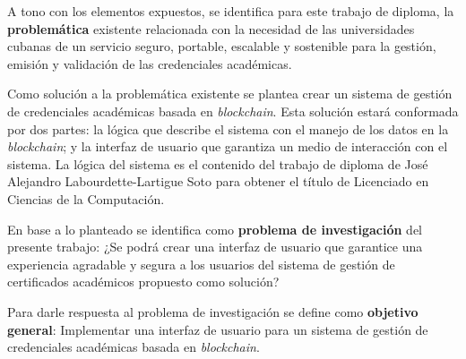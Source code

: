 
A tono con los elementos expuestos, se identifica para este trabajo de diploma, la \textbf{problem\'atica} existente relacionada con la necesidad de las universidades cubanas de un servicio seguro, portable, escalable y sostenible para la gestión, emisión y validación de las credenciales académicas.

Como solución a la problemática existente se plantea crear un sistema de gestión de credenciales académicas basada en \textit{blockchain}. Esta solución estará conformada por dos partes: la lógica que describe el sistema con el manejo de los datos en la \textit{blockchain}; y la interfaz de usuario que garantiza un medio de interacción con el sistema. La lógica del sistema es el contenido del trabajo de diploma de José Alejandro Labourdette-Lartigue Soto para obtener el título de Licenciado en Ciencias de la Computación.

En base a lo planteado se identifica como \textbf{problema de investigaci\'on} del presente trabajo: ¿Se podrá crear una interfaz de usuario que garantice una experiencia agradable y segura a los usuarios del sistema de gestión de certificados académicos propuesto como solución? 


Para darle respuesta al problema de investigación se define como \textbf{objetivo general}: Implementar una interfaz de usuario para un sistema de gestión de credenciales académicas basada en \textit{blockchain}.

